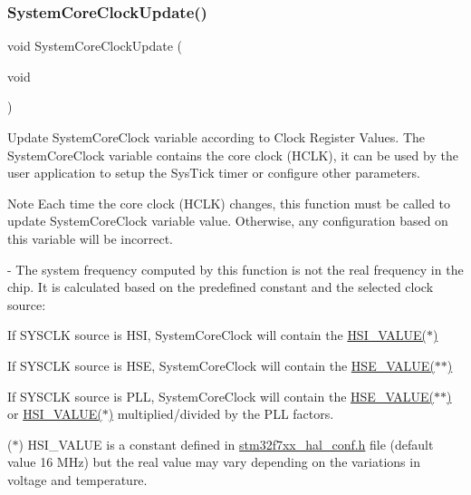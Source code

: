 \subsubsection{\texorpdfstring{System\+Core\+Clock\+Update()}{SystemCoreClockUpdate()}}
{\footnotesize\ttfamily void System\+Core\+Clock\+Update (\begin{DoxyParamCaption}\item[{void}]{ }\end{DoxyParamCaption})}



Update System\+Core\+Clock variable according to Clock Register Values. The System\+Core\+Clock variable contains the core clock (H\+C\+LK), it can be used by the user application to setup the Sys\+Tick timer or configure other parameters. 

\begin{DoxyNote}{Note}
Each time the core clock (H\+C\+LK) changes, this function must be called to update System\+Core\+Clock variable value. Otherwise, any configuration based on this variable will be incorrect.

-\/ The system frequency computed by this function is not the real frequency in the chip. It is calculated based on the predefined constant and the selected clock source\+:
\end{DoxyNote}

\begin{DoxyItemize}
\item If S\+Y\+S\+C\+LK source is H\+SI, System\+Core\+Clock will contain the \hyperlink{group___s_t_m32_f7xx___system___private___includes_gaaa8c76e274d0f6dd2cefb5d0b17fbc37}{H\+S\+I\+\_\+\+V\+A\+L\+U\+E($\ast$)}
\item If S\+Y\+S\+C\+LK source is H\+SE, System\+Core\+Clock will contain the \hyperlink{group___s_t_m32_f7xx___system___private___includes_gaeafcff4f57440c60e64812dddd13e7cb}{H\+S\+E\+\_\+\+V\+A\+L\+U\+E($\ast$$\ast$)}
\item If S\+Y\+S\+C\+LK source is P\+LL, System\+Core\+Clock will contain the \hyperlink{group___s_t_m32_f7xx___system___private___includes_gaeafcff4f57440c60e64812dddd13e7cb}{H\+S\+E\+\_\+\+V\+A\+L\+U\+E($\ast$$\ast$)} or \hyperlink{group___s_t_m32_f7xx___system___private___includes_gaaa8c76e274d0f6dd2cefb5d0b17fbc37}{H\+S\+I\+\_\+\+V\+A\+L\+U\+E($\ast$)} multiplied/divided by the P\+LL factors.
\end{DoxyItemize}

($\ast$) H\+S\+I\+\_\+\+V\+A\+L\+UE is a constant defined in \hyperlink{stm32f7xx__hal__conf_8h}{stm32f7xx\+\_\+hal\+\_\+conf.\+h} file (default value 16 M\+Hz) but the real value may vary depending on the variations in voltage and temperature.


